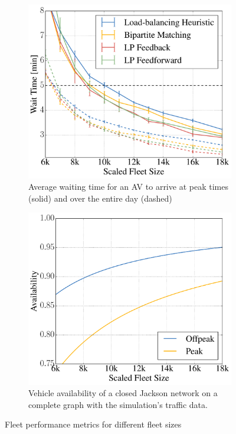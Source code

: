 \begin{figure}
    \centering
    \begin{subfigure}[t]{0.495\textwidth}
        \includegraphics[width=1.0\textwidth]{figures/mean_peak_waiting_times.pdf}
        \caption{Average waiting time for an AV to arrive at peak times (solid) and over the entire day (dashed)}
        \label{fig:mean_peak_waiting_times}
    \end{subfigure}\hfill
    \begin{subfigure}[t]{0.495\textwidth}
        \includegraphics[width=1.0\textwidth]{figures/availability.pdf}
        \caption{Vehicle availability of a closed Jackson network on a complete graph with the simulation's traffic data.}
        \label{fig:performanceavailability}
    \end{subfigure}
    \caption{Fleet performance metrics for different fleet sizes}
\end{figure}

